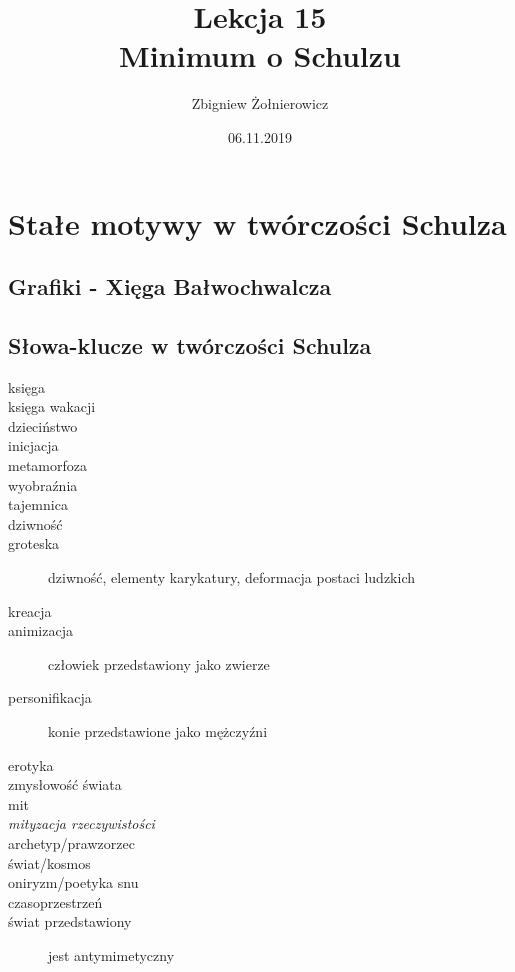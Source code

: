 \documentclass[a4paper]{article}
\begin{document}
\title{{\huge Lekcja 15} \\
{\large Minimum o Schulzu}}
\author{Zbigniew Żołnierowicz}
\date{06.11.2019}
\maketitle
\section{Stałe motywy w twórczości Schulza}
\subsection{Grafiki - Xięga Bałwochwalcza}
\subsection{Słowa-klucze w twórczości Schulza}
\begin{description}
    \item[księga] 
    \item[księga wakacji]
    \item[dzieciństwo]
    \item[inicjacja]
    \item[metamorfoza]
    \item[wyobraźnia]
    \item[tajemnica]
    \item[dziwność]
    \item[groteska] dziwność, elementy karykatury, deformacja postaci ludzkich
    \item[kreacja]
    \item[animizacja] człowiek przedstawiony jako zwierze
    \item[personifikacja] konie przedstawione jako mężczyźni
    \item[erotyka]
    \item[zmysłowość świata]
    \item[mit]
    \item[\emph{mityzacja rzeczywistości}]
    \item[archetyp/prawzorzec]
    \item[świat/kosmos]
    \item[oniryzm/poetyka snu]
    \item[czasoprzestrzeń] 
    \item[świat przedstawiony] jest antymimetyczny 
\end{description}
\end{document}
